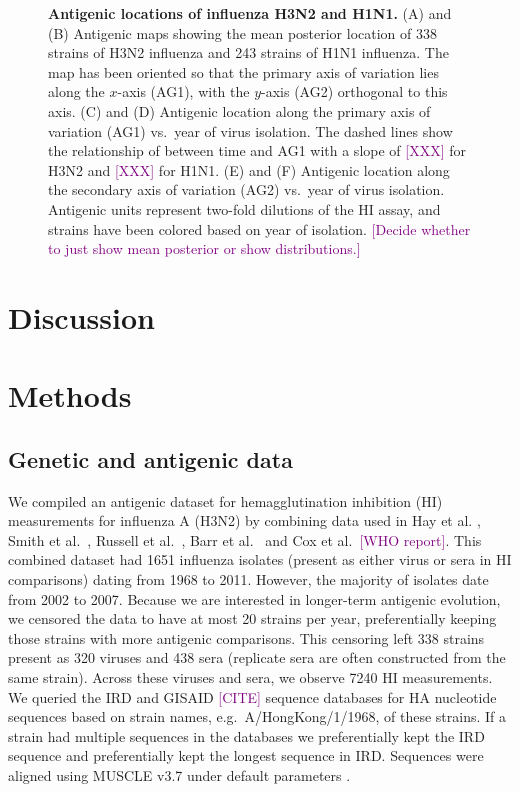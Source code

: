 \documentclass[11pt,oneside,letterpaper]{article}
\def\tbc#1{\textcolor{purple}{[#1]}}
\begin{document}
\begin{figure}[tb]
	\centering		
	\makebox[\textwidth]{	
	}
	\caption{\textbf{Antigenic locations of influenza H3N2 and H1N1.} (A) and (B) Antigenic maps showing the
mean posterior location of 338 strains of H3N2 influenza and 243 strains of H1N1 influenza.  The map has been
oriented so that the primary axis of variation lies along the $x$-axis (AG1), with the $y$-axis (AG2)
orthogonal to this axis.  (C) and (D) Antigenic location along the primary axis of variation (AG1) vs.\ year
of virus isolation.  The dashed lines show the relationship of between time and AG1 with a slope of \tbc{XXX}
for H3N2 and \tbc{XXX} for H1N1.  (E) and (F) Antigenic location along the secondary axis of variation (AG2)
vs.\ year of virus isolation.  Antigenic units represent two-fold dilutions of the HI assay, and strains have
been colored based on year of isolation.  \tbc{Decide whether to just show mean posterior or show
distributions.}}
	\label{mds}
\end{figure}

\section*{Discussion}

\section*{Methods}

\subsection*{Genetic and antigenic data}

We compiled an antigenic dataset for hemagglutination inhibition (HI) measurements for influenza A (H3N2) by
combining data used in Hay et al. \cite{Hay01}, Smith et al.\ \cite{Smith04}, Russell et al.\
\cite{Russell08}, Barr et al.\ \cite{Barr10} and Cox et al.\ \tbc{WHO report}. This combined dataset had 1651
influenza isolates (present as either virus or sera in HI comparisons) dating from 1968 to 2011. However, the
majority of isolates date from 2002 to 2007. Because we are interested in longer-term antigenic evolution, we
censored the data to have at most 20 strains per year, preferentially keeping those strains with more
antigenic comparisons. This censoring left 338 strains present as 320 viruses and 438 sera (replicate sera are
often constructed from the same strain). Across these viruses and sera, we observe 7240 HI measurements. We
queried the IRD \cite{IRD} and GISAID \tbc{CITE} sequence databases for HA nucleotide sequences based on
strain names, e.g.\ A/HongKong/1/1968, of these strains. If a strain had multiple sequences in the databases
we preferentially kept the IRD sequence and preferentially kept the longest sequence in IRD. Sequences were
aligned using MUSCLE v3.7 under default parameters \cite{MUSCLE}. 
\end{document}
